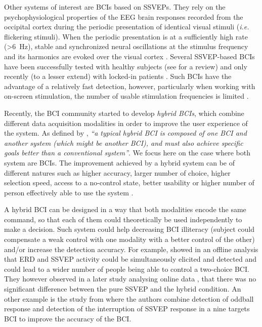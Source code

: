 \documentclass[10pt]{article}
\begin{document}
Other systems of interest are \acp{BCI} based on \acp{SSVEP}.
They rely on the psychophysiological properties of the EEG brain responses recorded from the occipital cortex during the periodic presentation of identical visual stimuli (\emph{i.e.} flickering stimuli).
When the periodic presentation is at a sufficiently high rate (\SI{>6}{\Hz}), stable and synchronized neural oscillations at the stimulus frequency and its harmonics are evoked over the visual cortex \parencite{Regan1966, Herrmann2001, Luck2005}.
Several \ac{SSVEP}-based \acp{BCI} have been successfully tested with healthy subjects (see \cite{Vialatte2010} for a review) and only recently (to a lesser extend) with locked-in patients \parencite{Parini2009, Combaz2013}.
Such \acp{BCI} have the advantage of a relatively fast detection, however, particularly when working with on-screen stimulation, the number of usable stimulation frequencies is limited \parencite{Bin2009}.

Recently, the \ac{BCI} community started to develop \emph{hybrid \acp{BCI}}, which combine different data acquisition modalities in order to improve the user experience of the system.
As defined by \textcite{Pfurtscheller2010}, \emph{``a typical hybrid \ac{BCI} is composed of one \ac{BCI} and another system (which might be another \ac{BCI}), and must also achieve specific goals better than a conventional system''}.
We focus here on the case where both system are \acp{BCI}.
The improvement achieved by a hybrid system can be of different natures such as higher accuracy, larger number of choice, higher selection speed, access to a no-control state, better usability or higher number of person effectively able to use the system \parencite{Brunner2011}.

A hybrid \ac{BCI} can be designed in a way that both modalities encode the same command, so that each of them could theoretically be used independently to make a decision.
Such system could help decreasing \ac{BCI} illiteracy (subject could compensate a weak control with one modality with a better control of the other) and/or increase the detection accuracy.
For example, \textcite{Allison2010a} showed in an offline analysis that \ac{ERD} and \ac{SSVEP} activity could be simultaneously elicited and detected and could lead to a wider number of people being able to control a two-choice \ac{BCI}.
They however observed in a later study analysing online data \parencite{Brunner2011}, that there was no significant difference between the pure \ac{SSVEP} and the hybrid condition.
An other example is the study from \textcite{Xu2013} where the authors combine detection of oddball response and detection of the interruption of \ac{SSVEP} response in a nine targets \ac{BCI} to improve the accuracy of the \ac{BCI}.
\end{document}
